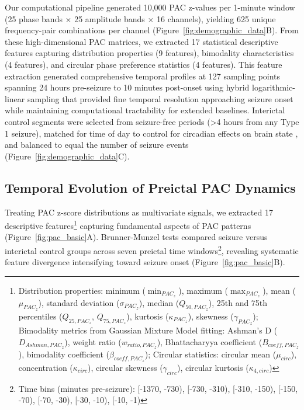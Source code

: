 Our computational pipeline generated 10,000 PAC z-values per 1-minute window (25 phase bands × 25 amplitude bands × 16 channels), yielding 625 unique frequency-pair combinations per channel (Figure~\ref{fig:demographic_data}B). From these high-dimensional PAC matrices, we extracted 17 statistical descriptive features capturing distribution properties (9 features), bimodality characteristics (4 features), and circular phase preference statistics (4 features). This feature extraction generated comprehensive temporal profiles at 127 sampling points spanning 24 hours pre-seizure to 10 minutes post-onset using hybrid logarithmic-linear sampling that provided fine temporal resolution approaching seizure onset while maintaining computational tractability for extended baselines. Interictal control segments were selected from seizure-free periods (>4 hours from any Type 1 seizure), matched for time of day to control for circadian effects on brain state \cite{Kuhlmann2018SeizurePA}, and balanced to equal the number of seizure events (Figure~\ref{fig:demographic_data}C).

\subsection{Temporal Evolution of Preictal PAC Dynamics}
Treating PAC z-score distributions as multivariate signals, we extracted 17 descriptive features\footnote{Distribution properties: minimum ($\min_{{PAC}_z}$), maximum ($\max_{{PAC}_z}$), mean ($\mu_{{PAC}_z}$), standard deviation ($\sigma_{{PAC}_z}$), median ($Q_{50,{PAC}_z}$), 25th and 75th percentiles ($Q_{25,{PAC}_z}$, $Q_{75,{PAC}_z}$), kurtosis ($\kappa_{{PAC}_z}$), skewness ($\gamma_{{PAC}_z}$); Bimodality metrics from Gaussian Mixture Model fitting: Ashman's D ($D_{Ashman,{PAC}_z}$), weight ratio ($w_{ratio,{PAC}_z}$), Bhattacharyya coefficient ($B_{coeff,{PAC}_z}$), bimodality coefficient ($\beta_{coeff,{PAC}_z}$); Circular statistics: circular mean ($\mu_{circ}$), concentration ($\kappa_{circ}$), circular skewness ($\gamma_{circ}$), circular kurtosis ($\kappa_{4,circ}$)} capturing fundamental aspects of PAC patterns (Figure~\ref{fig:pac_basic}A). Brunner-Munzel tests compared seizure versus interictal control groups across seven preictal time windows\footnote{Time bins (minutes pre-seizure): [-1370, -730), [-730, -310), [-310, -150), [-150, -70), [-70, -30), [-30, -10), [-10, -1)}, revealing systematic feature divergence intensifying toward seizure onset (Figure~\ref{fig:pac_basic}B).

